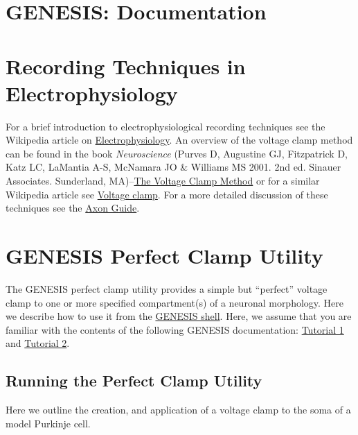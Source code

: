 \documentclass[12pt]{article}
\begin{document}
\section*{GENESIS: Documentation}

\section*{Recording Techniques in Electrophysiology}

For a brief introduction to electrophysiological recording techniques see the Wikipedia article on \href{http://en.wikipedia.org/wiki/Electrophysiology#Current_clamp}{Electrophysiology}. An overview of the voltage clamp method can be found in the book {\it Neuroscience} (Purves D, Augustine GJ,  Fitzpatrick D, Katz LC, LaMantia A-S, McNamara JO \& Williams MS 2001. 2nd ed. Sinauer Associates. Sunderland, MA)--\href{http://www.ncbi.nlm.nih.gov/books/bv.fcgi?rid=neurosci.box.174}{The Voltage Clamp Method} or for a similar Wikipedia article see \href{http://en.wikipedia.org/wiki/Voltage_clamp}{Voltage clamp}. For a more detailed discussion of these techniques see the \href{http://www.moleculardevices.com/pages/instruments/axon_guide.html}{Axon Guide}.

\section*{GENESIS Perfect Clamp Utility}

The GENESIS perfect clamp utility provides a simple but ``perfect'' voltage clamp to one or more specified compartment(s) of a neuronal morphology. Here we describe how to use it from the \href{../gshell/gshell.tex}{GENESIS shell}. Here, we assume that you are familiar with the contents of the following GENESIS documentation: \href{../tutorial1/tutorial1.tex}{Tutorial 1} and \href{../tutorial1/tutorial2.tex}{Tutorial 2}.

\subsection*{Running the Perfect Clamp Utility}

Here we outline the creation, and application of a voltage clamp to the soma of a model Purkinje cell.
\end{document}
